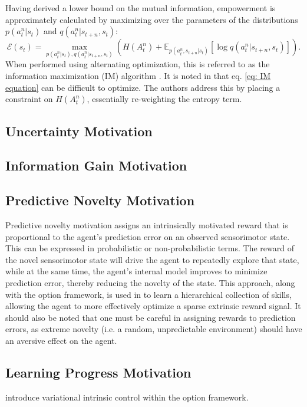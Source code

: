 Having derived a lower bound on the mutual information, empowerment is approximately calculated by maximizing over the parameters of the distributions $p(a^n_t | s_t)$ and $q(a^n_t | s_{t+n}, s_t)$:
\begin{equation}
    \mathcal{E} (s_t) = \max_{p (a^n_t | s_t), q(a^n_t | s_{t+n}, s_t)} \left( H(A^n_t) + \mathbb{E}_{p(a^n_t , s_{t+n} | s_t)} \left[ \log q(a^n_t | s_{t+n}, s_t) \right] \right).
    \label{eq: IM equation}
\end{equation}
When performed using alternating optimization, this is referred to as the information maximization (IM) algorithm \cite{barber2003algorithm}. It is noted in \cite{mohamed2015variational} that eq. \ref{eq: IM equation} can be difficult to optimize. The authors address this by placing a constraint on $H(A^n_t)$, essentially re-weighting the entropy term.

\subsection{Uncertainty Motivation}

\subsection{Information Gain Motivation}

\subsection{Predictive Novelty Motivation}

Predictive novelty motivation assigns an intrinsically motivated reward that is proportional to the agent's prediction error on an observed sensorimotor state. This can be expressed in probabilistic or non-probabilistic terms. The reward of the novel sensorimotor state will drive the agent to repeatedly explore that state, while at the same time, the agent's internal model improves to minimize prediction error, thereby reducing the novelty of the state. This approach, along with the option framework, is used in \cite{barto2004intrinsically} to learn a hierarchical collection of skills, allowing the agent to more effectively optimize a sparse extrinsic reward signal. It should also be noted that one must be careful in assigning rewards to prediction errors, as extreme novelty (i.e. a random, unpredictable environment) should have an aversive effect on the agent.

\subsection{Learning Progress Motivation}

\noindent \cite{gregor2016variational} introduce variational intrinsic control within the option framework.

